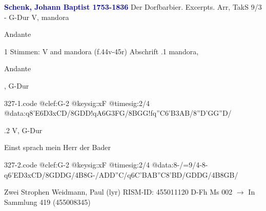 \documentclass[twocolumn]{book}
\begin{document}
\newline \par \vspace{7pt} \textcolor{darkblue}{\textbf{Schenk, Johann Baptist  1753-1836}}
\newline Der Dorfbarbier. Excerpts. Arr, TakS 9/3 - G-Dur
\newline V, mandora
\newline \begin{itshape}[at left, f.44v:] Andante\end{itshape} 
\newline \textcolor{darkblue}{}  1 Stimmen: V and mandora  (f.44v-45r)
\newline Abschrift
.1  mandora, \begin{itshape}Andante\end{itshape}, G-Dur  
\begin{filecontents*}{327-1.code}
@clef:G-2
@keysig:xF
@timesig:2/4
@data:q8'E{6D3xCD}/{8GDD}!qA{6G3FG}/{8BGG}!fq''C{6'B3AB}/{8''D'GG''D}/
\end{filecontents*}
\newline
%
.2  V, G-Dur
\newline \begin{footnotesize} Einst sprach mein Herr der Bader \end{footnotesize}  
\begin{filecontents*}{327-2.code}
@clef:G-2
@keysig:xF
@timesig:2/4
@data:8-/=9/4-8-q6'E{D3xCD}/{8GDDG}/4B8G-/{ADD''C}/q6C{'BAB''C}{8'BD}/{GDDG}/4B{8GB}/
\end{filecontents*}
\newline
%
\newline Zwei Strophen
\newline Weidmann, Paul  (lyr)
\newline RISM-ID: 455011120
\newline D-Fh  Ms 002
\newline $\rightarrow$ In Sammlung 419 (455008345)
      
\end{document}

